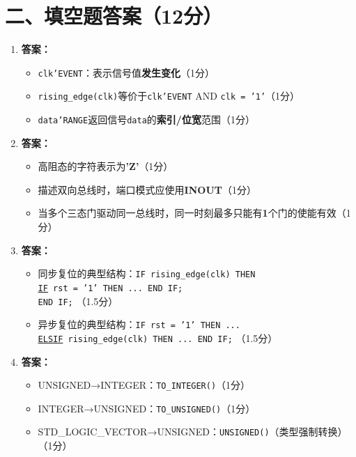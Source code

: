 \section{二、填空题答案（12分）}

\begin{enumerate}[label=\arabic*., leftmargin=*]

\item \textbf{答案：}
\begin{itemize}
  \item \texttt{clk'EVENT}：表示信号值\textbf{发生变化}（1分）
  \item \texttt{rising\_edge(clk)}等价于\texttt{clk'EVENT} AND \texttt{clk = '1'}（1分）
  \item \texttt{data'RANGE}返回信号\texttt{data}的\textbf{索引/位宽}范围（1分）
\end{itemize}

\item \textbf{答案：}
\begin{itemize}
  \item 高阻态的字符表示为\textbf{'Z'}（1分）
  \item 描述双向总线时，端口模式应使用\textbf{INOUT}（1分）
  \item 当多个三态门驱动同一总线时，同一时刻最多只能有\textbf{1}个门的使能有效（1分）
\end{itemize}

\item \textbf{答案：}
\begin{itemize}
  \item 同步复位的典型结构：\texttt{IF rising\_edge(clk) THEN}\\
    \quad \texttt{\underline{IF} rst = '1' THEN ... END IF;}\\
    \texttt{END IF;} （1.5分）
  \item 异步复位的典型结构：\texttt{IF rst = '1' THEN ...}\\
    \texttt{\underline{ELSIF} rising\_edge(clk) THEN ... END IF;} （1.5分）
\end{itemize}

\item \textbf{答案：}
\begin{itemize}
  \item UNSIGNED→INTEGER：\texttt{TO\_INTEGER()}（1分）
  \item INTEGER→UNSIGNED：\texttt{TO\_UNSIGNED()}（1分）
  \item STD\_LOGIC\_VECTOR→UNSIGNED：\texttt{UNSIGNED()}（类型强制转换）（1分）
\end{itemize}

\end{enumerate}

